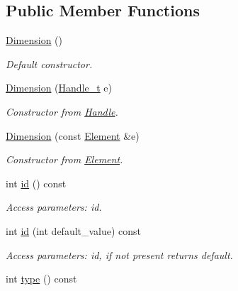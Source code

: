 \subsection*{Public Member Functions}
\begin{DoxyCompactItemize}
\item 
\hyperlink{struct_d_d4hep_1_1_x_m_l_1_1_dimension_a26a1bd5015aa6f00de8ab79682a42e89}{Dimension} ()
\begin{DoxyCompactList}\small\item\em Default constructor. \item\end{DoxyCompactList}\item 
\hyperlink{struct_d_d4hep_1_1_x_m_l_1_1_dimension_a8b3cbebb82c2b3570c87147680386c99}{Dimension} (\hyperlink{class_d_d4hep_1_1_x_m_l_1_1_handle__t}{Handle\_\-t} e)
\begin{DoxyCompactList}\small\item\em Constructor from \hyperlink{class_d_d4hep_1_1_handle}{Handle}. \item\end{DoxyCompactList}\item 
\hyperlink{struct_d_d4hep_1_1_x_m_l_1_1_dimension_a692c1ee2c052d427794af750fe2faa6d}{Dimension} (const \hyperlink{class_d_d4hep_1_1_x_m_l_1_1_element}{Element} \&e)
\begin{DoxyCompactList}\small\item\em Constructor from \hyperlink{class_d_d4hep_1_1_x_m_l_1_1_element}{Element}. \item\end{DoxyCompactList}\item 
int \hyperlink{struct_d_d4hep_1_1_x_m_l_1_1_dimension_a60d036beca11ef19a6843c24b96151d9}{id} () const 
\begin{DoxyCompactList}\small\item\em Access parameters: id. \item\end{DoxyCompactList}\item 
int \hyperlink{struct_d_d4hep_1_1_x_m_l_1_1_dimension_a563494ba6c6ded9dc528e66181bd5bd2}{id} (int default\_\-value) const 
\begin{DoxyCompactList}\small\item\em Access parameters: id, if not present returns default. \item\end{DoxyCompactList}\item 
int \hyperlink{struct_d_d4hep_1_1_x_m_l_1_1_dimension_abb81bc1821e8003982eea5b136f70788}{type} () const 

\end{DoxyCompactItemize}
